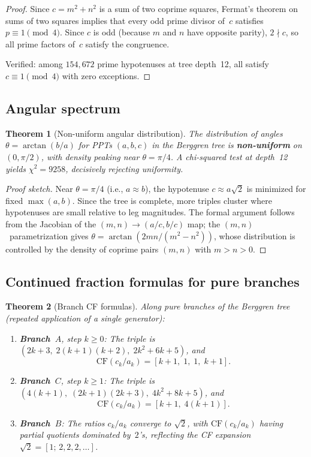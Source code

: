 \documentclass[12pt]{amsart}
\newtheorem{theorem}{Theorem}[section]
\theoremstyle{definition}
\theoremstyle{remark}
\begin{document}
\begin{proof}
Since $c=m^{2}+n^{2}$ is a sum of two coprime squares, Fermat's theorem on
sums of two squares implies that every odd prime divisor of~$c$ satisfies
$p\equiv1\pmod{4}$.  Since $c$ is odd (because $m$ and $n$ have opposite
parity), $2\nmid c$, so all prime factors of~$c$ satisfy the congruence.

Verified: among $154{,}672$ prime hypotenuses at tree depth~12, all satisfy
$c\equiv1\pmod{4}$ with zero exceptions.
\end{proof}

\subsection{Angular spectrum}

\begin{theorem}[Non-uniform angular distribution]\label{thm:angular}
The distribution of angles $\theta=\arctan(b/a)$ for PPTs $(a,b,c)$ in the
Berggren tree is \textbf{non-uniform} on $(0,\pi/2)$, with density peaking near
$\theta=\pi/4$.  A chi-squared test at depth~12 yields $\chi^{2}=9258$,
decisively rejecting uniformity.
\end{theorem}

\begin{proof}[Proof sketch]
Near $\theta=\pi/4$ (i.e., $a\approx b$), the hypotenuse $c\approx a\sqrt{2}$
is minimized for fixed $\max(a,b)$.  Since the tree is complete, more triples
cluster where hypotenuses are small relative to leg magnitudes.  The formal
argument follows from the Jacobian of the $(m,n)\to(a/c,b/c)$ map; the
$(m,n)$~parametrization gives $\theta=\arctan(2mn/(m^{2}-n^{2}))$, whose
distribution is controlled by the density of coprime pairs $(m,n)$ with
$m>n>0$.
\end{proof}

\subsection{Continued fraction formulas for pure branches}

\begin{theorem}[Branch CF formulas]\label{thm:cf}
Along pure branches of the Berggren tree (repeated application of a single generator):
\begin{enumerate}[label=(\alph*)]
  \item \textbf{Branch~$A$}, step $k\ge0$: The triple is
    $(2k+3,\;2(k+1)(k+2),\;2k^{2}+6k+5)$, and
    \[
      \mathrm{CF}(c_{k}/a_{k}) = [k+1,\;1,\;1,\;k+1].
    \]
  \item \textbf{Branch~$C$}, step $k\ge1$: The triple is
    $(4(k+1),\;(2k+1)(2k+3),\;4k^{2}+8k+5)$, and
    \[
      \mathrm{CF}(c_{k}/a_{k}) = [k+1,\;4(k+1)].
    \]
  \item \textbf{Branch~$B$}: The ratios $c_{k}/a_{k}$ converge to $\sqrt{2}$,
    with $\mathrm{CF}(c_{k}/a_{k})$ having partial quotients dominated by~$2$'s,
    reflecting the CF expansion $\sqrt{2}=[1;\,2,2,2,\ldots]$.
\end{enumerate}
\end{theorem}
\end{document}
